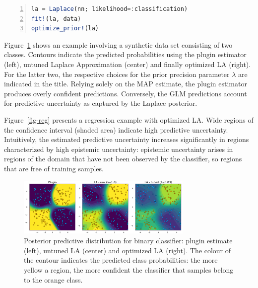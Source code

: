 \documentclass{juliacon}
\begin{document}
\begin{lstlisting}[language=Julia, escapechar=@, numbers=left, label={lst:laplace}, caption={}]
la = Laplace(nn; likelihood=:classification)
fit!(la, data)
optimize_prior!(la)
\end{lstlisting}

Figure~\ref{fig-class} shows an example involving a synthetic data set
consisting of two classes. Contours indicate the predicted probabilities
using the plugin estimator (left), untuned Laplace Approximation
(center) and finally optimized LA (right). For the latter two, the
respective choices for the prior precision parameter \(\lambda\) are
indicated in the title. Relying solely on the MAP estimate, the plugin
estimator produces overly confident predictions. Conversely, the GLM
predictions account for predictive uncertainty as captured by the
Laplace posterior.

Figure~\ref{fig-reg} presents a regression example with optimized LA.
Wide regions of the confidence interval (shaded area) indicate high
predictive uncertainty. Intuitively, the estimated predictive
uncertainty increases significantly in regions characterized by high
epistemic uncertainty: epistemic uncertainty arises in regions of the
domain that have not been observed by the classifier, so regions that
are free of training samples.

\begin{figure}

{\centering \includegraphics[width=3.33333in,height=1.11667in]{www/posterior_predictive_mlp.png}

}

\caption{\label{fig-class}Posterior predictive distribution for binary
classifier: plugin estimate (left), untuned LA (center) and optimized LA
(right). The colour of the contour indicates the predicted class
probabilities: the more yellow a region, the more confident the
classifier that samples belong to the orange class.}

\end{figure}
\end{document}
